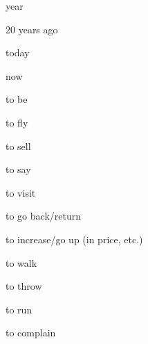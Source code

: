 \begin{flashcard}{\LARGE year}
\LARGE {}
\end{flashcard}
\begin{flashcard}{\LARGE 20 years ago}
\LARGE {}
\end{flashcard}
\begin{flashcard}{\LARGE today}
\LARGE {}
\end{flashcard}
\begin{flashcard}{\LARGE now}
\LARGE {}
\end{flashcard}
\begin{flashcard}{\LARGE to be}
\LARGE {}
\end{flashcard}
\begin{flashcard}{\LARGE to fly}
\LARGE {}
\end{flashcard}
\begin{flashcard}{\LARGE to sell}
\LARGE {}
\end{flashcard}
\begin{flashcard}{\LARGE to say}
\LARGE {}
\end{flashcard}
\begin{flashcard}{\LARGE to visit}
\LARGE {}
\end{flashcard}
\begin{flashcard}{\LARGE to go back/return}
\LARGE {}
\end{flashcard}
\begin{flashcard}{\LARGE to increase/go up (in price, etc.)}
\LARGE {}
\end{flashcard}
\begin{flashcard}{\LARGE to walk}
\LARGE {}
\end{flashcard}
\begin{flashcard}{\LARGE to throw}
\LARGE {}
\end{flashcard}
\begin{flashcard}{\LARGE to run}
\LARGE {}
\end{flashcard}
\begin{flashcard}{\LARGE to complain}
\LARGE {}
\end{flashcard}

